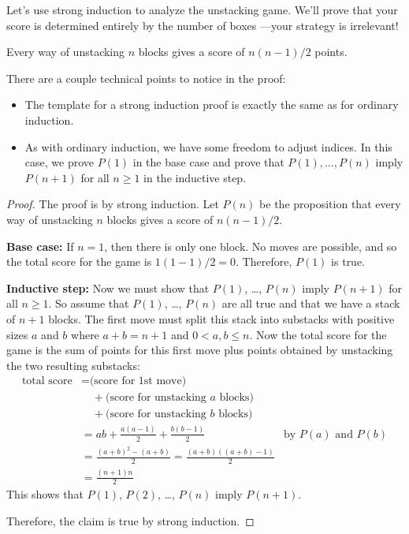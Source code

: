 
Let's use strong induction to analyze the unstacking game.  We'll prove
that your score is determined entirely by the number of boxes ---your
strategy is irrelevant!

\begin{theorem}\label{stacking}
Every way of unstacking $n$ blocks gives a score of $n(n-1)/2$ points.
\end{theorem}

There are a couple technical points to notice in the proof:

\begin{itemize}

\item The template for a strong induction proof is exactly the same as
for ordinary induction.

\item As with ordinary induction, we have some freedom to adjust indices.
In this case, we prove $P(1)$ in the base case and prove that $P(1),
\dots, P(n)$ imply $P(n+1)$ for all $n \geq 1$ in the inductive step.

\end{itemize}

\begin{proof}
The proof is by strong induction.  Let $P(n)$ be the proposition that
every way of unstacking $n$ blocks gives a score of $n(n-1)/2$.

\textbf{Base case:} If $n = 1$, then there is only one
block.  No moves are possible, and so the total score for the game is
$1(1 - 1)/2 = 0$.  Therefore, $P(1)$ is true.

\textbf{Inductive step:} Now we must show that $P(1)$, \dots, $P(n)$ imply
$P(n+1)$ for all $n \geq 1$.  So assume that $P(1)$, \dots, $P(n)$ are all
true and that we have a stack of $n+1$ blocks.  The first move must split
this stack into substacks with positive sizes $a$ and $b$ where $a+b =
n+1$ and $0<a,b\leq n$.  Now the total score for the game is the sum of
points for this first move plus points obtained by unstacking the two
resulting substacks:
%
\begin{align*}
\text{total score}
    & = \text{(score for 1st move)} \\
    & \quad + \text{(score for unstacking $a$ blocks)} \\
    & \quad + \text{(score for unstacking $b$ blocks)} \\
    & = ab + \frac{a(a-1)}{2} + \frac{b(b-1)}{2} & \text{by $P(a)$ and $P(b)$}\\
    & = \frac{(a+b)^2-(a+b)}{2} = \frac{(a+b)((a+b)-1)}{2}\\
    & = \frac{(n+1)n}{2}
\end{align*}
%
This shows that $P(1)$, $P(2)$, \dots, $P(n)$ imply $P(n+1)$.

Therefore, the claim is true by strong induction.
\end{proof}

